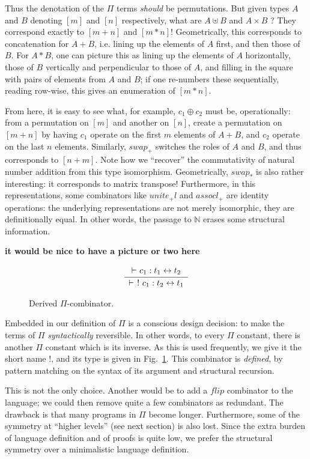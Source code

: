 \documentclass{article}
\newcommand{\identlp}{\mathit{unite}_+\mathit{l}}
\newcommand{\swapp}{\mathit{swap}_+}
\newcommand{\assoclp}{\mathit{assocl}_+}
\newcommand{\swapt}{\mathit{swap}_*}
\newcommand{\iso}{\leftrightarrow}
\newcommand{\proves}{\vdash}
\newcommand{\Rule}[4]{
\makebox{{\rm #1}
$\displaystyle
\frac{\begin{array}{l}#2 \\\end{array}}
{\begin{array}{l}#3      \\\end{array}}$
 #4}}
\newcommand{\jdg}[3]{#2 \proves_{#1} #3}
\newcommand{\jc}[1]{\fbox{Jacques says:} \textbf{#1}}
\newcommand{\fin}[1]{\ensuremath{\left[#1\right]}}
\newcommand{\Nat}{\ensuremath{\mathbb{N}}}
\begin{document}
Thus the denotation of the $\Pi$ terms \emph{should} be permutations. But
given types $A$ and $B$ denoting $\fin{m}$ and $\fin{n}$ respectively,
what are $A \uplus B$ and $A \times B$ ?  They correspond exactly to
$\fin{m+n}$ and $\fin{m*n}$!  Geometrically, this corresponds to
concatenation for $A + B$, i.e. lining up the elements of $A$ first,
and then those of $B$. For $A * B$, one can picture this as
lining up the elements of $A$ horizontally, those of $B$ vertically
and perpendicular to those of $A$, and filling in the square with
pairs of elements from $A$ and $B$; if one re-numbers these sequentially,
reading row-wise, this gives an enumeration of $\fin{m*n}$.

From here, it is easy to see what, for example, $c_1 \oplus c_2$ must be,
operationally: from a permutation on $\fin{m}$ and another on $\fin{n}$,
create a permutation on $\fin{m+n}$ by having $c_1$ operate on the first
$m$ elements of $A+B$, and $c_2$ operate on the last $n$ elements.
Similarly, $\swapp$ switches the roles of $A$ and $B$, and thus corresponds
to $\fin{n+m}$. Note how we ``recover'' the commutativity of
natural number addition from this type isomorphism. Geometrically, $\swapt$
is also rather interesting: it corresponds to matrix transpose!
Furthermore, in this representations, some combinators like
$\identlp$ and $\assoclp$ are identity operations: the underlying representations
are not merely isomorphic, they are definitionally equal.
In other words, the passage to $\Nat$ erases some structural information.

\jc{it would be nice to have a picture or two here}

\begin{figure}[t]
\[
\Rule{}
{\jdg{}{}{c_1 : t_1 \iso t_2}}
{\jdg{}{}{\ !\ c_1 : t_2 \iso t_1}}
{}
\]
\caption{Derived $\Pi$-combinator.}
\label{derived-pi-combinator}
\end{figure}

Embedded in our definition of $\Pi$ is a conscious design decision: to make the
terms of $\Pi$ \emph{syntactically} reversible. In other words, to
every $\Pi$ constant, there is another $\Pi$ constant which is its
inverse. As this is used frequently, we give it the short name $!$,
and its type is given in Fig.~\ref{derived-pi-combinator}. This
combinator is \emph{defined}, by pattern matching on the syntax of
its argument and structural recursion.

This is not the only choice.  Another would be to add a
$\mathit{flip}$ combinator to the language; we could then remove
quite a few combinators as redundant. The drawback is that many
programs in $\Pi$ become longer. Furthermore, some of the symmetry
at ``higher levels'' (see next section) is also lost. Since the
extra burden of language definition and of proofs is quite low, we
prefer the structural symmetry over a minimalistic language definition.
\end{document}
